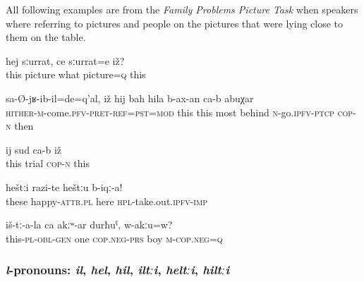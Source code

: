 All following examples are from the \textit{Family Problems Picture Task} when speakers where referring to pictures and people on the pictures that were lying close to them on the table.
%
\begin{exe}
	\ex	\label{This picture, what picture is it/this}
	\gll	hej	sːurrat,	ce	sːurrat=e	iž?\\
		this	picture	what	picture=\textsc{q}	this\\
	\glt	{}

	\ex	\label{This is when he came back; this (iž) then needs to be the (hij) very last}
	\gll	sa-Ø-jʁ-ib-il=de=q'al,	iž	hij	bah	hila	b-ax-an ca-b	abuχar\\
		\textsc{hither-m}-come.\textsc{pfv}-\textsc{pret}-\textsc{ref}=\textsc{pst}=\textsc{mod}	this	this	most	behind	\textsc{n}-go.\textsc{ipfv}-\textsc{ptcp} \textsc{cop-n}	then\\
	\glt	{}

	\ex	\label{This (iž) is the (ij) trial}
	\gll	ij	sud	ca-b	iž\\
		this	trial	\textsc{cop-n}	this\\
	\glt {}
	
\ex	\label{These happy ones (=happy people on a picture) give them here!}
	\gll	heštːi	razi-te	heštːu	b-iqː-a! \\
		these	happy-\textsc{attr}\textsc{.pl} 	here	\textsc{hpl}-take.out.\textsc{ipfv}-\textsc{imp}\\
	\glt	{}

	\ex	\label{They have only one son, right?}
	\gll	iš-tː-a-la	ca	akːʷ-ar	durħuˁ,	w-akːu=w?\\
		this-\textsc{pl}-\textsc{obl}-\textsc{gen}	one	\textsc{cop.neg}-\textsc{prs} boy	\textsc{m}-\textsc{cop.neg}=\textsc{q}\\
	\glt	{}


\end{exe}



\subsubsection{\textit{l}-pronouns: \textit{il}, \textit{hel}, \textit{hil}, \textit{iltːi}, \textit{heltːi}, \textit{hiltːi}}
\label{sssec:l-pronouns}

